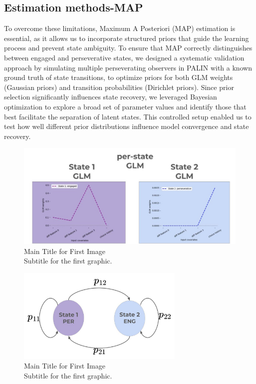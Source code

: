 \subsection {Estimation methods-MAP} 
To overcome these limitations, Maximum A Posteriori (MAP) estimation is essential, as it allows us to incorporate structured priors that guide the learning process and prevent state ambiguity. To ensure that MAP correctly distinguishes between engaged and perseverative states, we designed a systematic validation approach by simulating multiple perseverating observers in PALIN with a known ground truth of state transitions, to optimize priors for both GLM weights (Gaussian priors) and transition probabilities (Dirichlet priors). Since prior selection significantly influences state recovery, we leveraged Bayesian optimization to explore a broad set of parameter values and identify those that best facilitate the separation of latent states. This controlled setup enabled us to test how well different prior distributions influence model convergence and state recovery.


\begin{figure}[H]
    \centering
    \includegraphics[width=15cm]{MainLayout/Images/chapter7/glm_perstate.jpg}
    \caption{Main Title for First Image \\ \small Subtitle for the first graphic.}
    \label{fig:glm_perstate}
\end{figure}
\begin{figure}[H]
    \centering
    \includegraphics[width=8cm]{MainLayout/Images/chapter7/transition.jpg}
    \caption{Main Title for First Image \\ \small Subtitle for the first graphic.}
    \label{fig:transition}
\end{figure}


